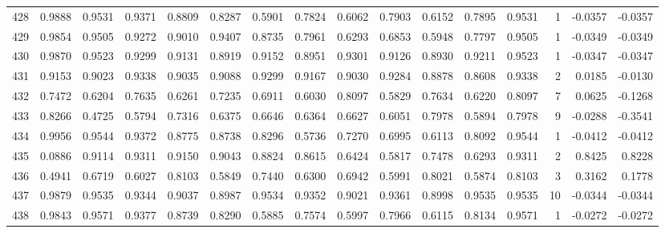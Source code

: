 \begin{tabular}{lrrrrrrrrrrrrrrr}
428 &      0.9888 &  0.9531 &  0.9371 &  0.8809 &  0.8287 &  0.5901 &  0.7824 &  0.6062 &  0.7903 &  0.6152 &   0.7895 &     0.9531 &      1 &                   -0.0357 &                    -0.0357 \\
429 &      0.9854 &  0.9505 &  0.9272 &  0.9010 &  0.9407 &  0.8735 &  0.7961 &  0.6293 &  0.6853 &  0.5948 &   0.7797 &     0.9505 &      1 &                   -0.0349 &                    -0.0349 \\
430 &      0.9870 &  0.9523 &  0.9299 &  0.9131 &  0.8919 &  0.9152 &  0.8951 &  0.9301 &  0.9126 &  0.8930 &   0.9211 &     0.9523 &      1 &                   -0.0347 &                    -0.0347 \\
431 &      0.9153 &  0.9023 &  0.9338 &  0.9035 &  0.9088 &  0.9299 &  0.9167 &  0.9030 &  0.9284 &  0.8878 &   0.8608 &     0.9338 &      2 &                    0.0185 &                    -0.0130 \\
432 &      0.7472 &  0.6204 &  0.7635 &  0.6261 &  0.7235 &  0.6911 &  0.6030 &  0.8097 &  0.5829 &  0.7634 &   0.6220 &     0.8097 &      7 &                    0.0625 &                    -0.1268 \\
433 &      0.8266 &  0.4725 &  0.5794 &  0.7316 &  0.6375 &  0.6646 &  0.6364 &  0.6627 &  0.6051 &  0.7978 &   0.5894 &     0.7978 &      9 &                   -0.0288 &                    -0.3541 \\
434 &      0.9956 &  0.9544 &  0.9372 &  0.8775 &  0.8738 &  0.8296 &  0.5736 &  0.7270 &  0.6995 &  0.6113 &   0.8092 &     0.9544 &      1 &                   -0.0412 &                    -0.0412 \\
435 &      0.0886 &  0.9114 &  0.9311 &  0.9150 &  0.9043 &  0.8824 &  0.8615 &  0.6424 &  0.5817 &  0.7478 &   0.6293 &     0.9311 &      2 &                    0.8425 &                     0.8228 \\
436 &      0.4941 &  0.6719 &  0.6027 &  0.8103 &  0.5849 &  0.7440 &  0.6300 &  0.6942 &  0.5991 &  0.8021 &   0.5874 &     0.8103 &      3 &                    0.3162 &                     0.1778 \\
437 &      0.9879 &  0.9535 &  0.9344 &  0.9037 &  0.8987 &  0.9534 &  0.9352 &  0.9021 &  0.9361 &  0.8998 &   0.9535 &     0.9535 &     10 &                   -0.0344 &                    -0.0344 \\
438 &      0.9843 &  0.9571 &  0.9377 &  0.8739 &  0.8290 &  0.5885 &  0.7574 &  0.5997 &  0.7966 &  0.6115 &   0.8134 &     0.9571 &      1 &                   -0.0272 &                    -0.0272 \\

\end{tabular}
